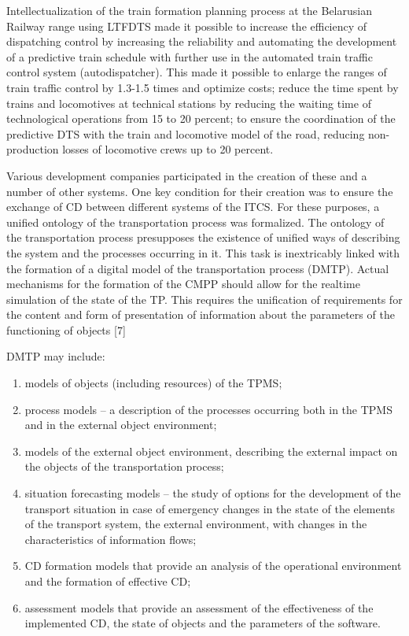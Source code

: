 \documentclass{article}
\begin{document}
\begin{multicols}{2}
 Intellectualization of the train formation planning process at the Belarusian Railway range using LTFDTS
made it possible to increase the efficiency of dispatching
control by increasing the reliability and automating the
development of a predictive train schedule with further
use in the automated train traffic control system (autodispatcher). This made it possible to enlarge the ranges
of train traffic control by 1.3-1.5 times and optimize
costs; reduce the time spent by trains and locomotives
at technical stations by reducing the waiting time of
technological operations from 15 to 20 percent; to ensure
the coordination of the predictive DTS with the train and
locomotive model of the road, reducing non-production
losses of locomotive crews up to 20 percent.

 Various development companies participated in the
creation of these and a number of other systems. One key
condition for their creation was to ensure the exchange
of CD between different systems of the ITCS. For these
purposes, a unified ontology of the transportation process
was formalized.
 The ontology of the transportation process presupposes
the existence of unified ways of describing the system
and the processes occurring in it. This task is inextricably
linked with the formation of a digital model of the
transportation process (DMTP). Actual mechanisms for
the formation of the CMPP should allow for the realtime simulation of the state of the TP. This requires the
unification of requirements for the content and form of
presentation of information about the parameters of the
functioning of objects [7] 

 DMTP may include:
 \begin{enumerate}
     \item models of objects (including resources) of the
TPMS; \item process models – a description of the processes
occurring both in the TPMS and in the external
object environment;
    \item models of the external object environment, describing the external impact on the objects of the
transportation process;
    \item situation forecasting models – the study of options
for the development of the transport situation in
case of emergency changes in the state of the
elements of the transport system, the external environment, with changes in the characteristics of
information flows;
    \item CD formation models that provide an analysis of
the operational environment and the formation of
effective CD;
    \item assessment models that provide an assessment of
the effectiveness of the implemented CD, the state
of objects and the parameters of the software.\
 \end{enumerate}
 

\end{multicols}
\end{document}
